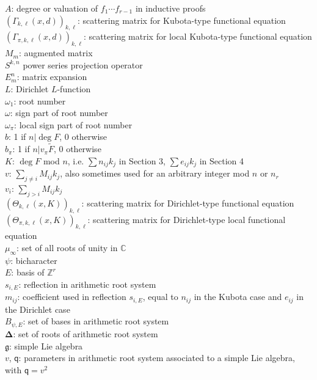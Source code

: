 \documentclass[11pt,letterpaper]{article}
\theoremstyle{definition}
\theoremstyle{remark}
\numberwithin{equation}{section}
\theoremstyle{dotless}
\newcommand{\hchi}{\psi} %
\newcommand{\qq}{\mathbf{ \mathsf{q}}} %
\renewcommand{\tilde}{\widetilde}
\begin{document}
$A$: degree or valuation of $f_1\cdots f_{r-1}$ in inductive proofs \\
$\left( \Gamma_{k, \ell}(x, d) \right)_{k, \ell}$: scattering matrix for Kubota-type functional equation \\
$\left( \Gamma_{\pi, k, \ell}(x, d) \right)_{k, \ell}$: scattering matrix for local Kubota-type functional equation \\
$M_m$: augmented matrix \\
$S^{k, n}$ power series projection operator \\
$E_m^n$: matrix expansion \\
$L$: Dirichlet $L$-function \\
$\omega_1$: root number \\
$\omega$: sign part of root number \\
$\omega_\pi$: local sign part of root number \\
$b$: 1 if $n|\deg F$, $0$ otherwise \\
$b_{\pi}$: 1 if $n|v_\pi \tilde{F}$, $0$ otherwise \\
$K$: $\deg F$ mod $n$, i.e. $\sum n_{ij} k_j$ in Section 3, $\sum e_{ij} k_j$ in Section 4 \\
$v$: $\sum_{j \neq i} M_{ij} k_j$, also sometimes used for an arbitrary integer mod $n$ or $n_r$ \\
$v_i$: $\sum_{j > i} M_{ij} k_j$ \\
$\left(\Theta_{k, \ell}(x, K)\right)_{k, \ell}$: scattering matrix for Dirichlet-type functional equation \\
$\left(\Theta_{\pi, k, \ell}(x, K)\right)_{k, \ell}$: scattering matrix for Dirichlet-type local functional equation \\
$\mu_\infty$: set of all roots of unity in $\mathbb C$ \\
$\hchi$: bicharacter \\
$E$: basis of $\mathbb Z^r$ \\
$s_{i,E}$: reflection in arithmetic root system \\
$m_{ij}$: coefficient used in reflection $s_{i,E}$, equal to $n_{ij}$ in the Kubota case and $e_{ij}$ in the Dirichlet case \\
$B_{\hchi,E}$: set of bases in arithmetic root system \\
$\mathbf \Delta$: set of roots of arithmetic root system \\
$\mathfrak g$: simple Lie algebra \\
$v$, $\qq$: parameters in arithmetic root system associated to a simple Lie algebra, with $\qq=v^2$ \\
\end{document}
